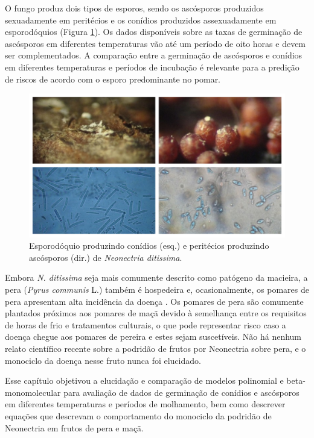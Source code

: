 \documentclass[a4paper,]{book}
\begin{document}
O fungo produz dois tipos de esporos, sendo os ascósporos produzidos
sexuadamente em peritécios e os conídios produzidos assexuadamente em
esporodóquios (Figura \ref{fig:prancha02}). Os dados disponíveis sobre
as taxas de germinação de ascósporos em diferentes temperaturas vão até
um período de oito horas \citep{Latorre2002} e devem ser complementados.
A comparação entre a germinação de ascósporos e conídios em diferentes
temperaturas e períodos de incubação é relevante para a predição de
riscos de acordo com o esporo predominante no pomar.




\begin{figure}

{\centering \includegraphics[width=1\linewidth]{./jhulia/prancha02} 

}

\caption{Esporodóquio produzindo conídios (esq.) e peritécios
produzindo ascósporos (dir.) de \emph{Neonectria ditissima}.}\label{fig:prancha02}
\end{figure}

Embora \emph{N. ditissima} seja mais comumente descrito como patógeno da
macieira, a pera (\emph{Pyrus communis} L.) também é hospedeira
\citep{Flack1977} e, ocasionalmente, os pomares de pera apresentam alta
incidência da doença \citep{Weber2014}. Os pomares de pera são comumente
plantados próximos aos pomares de maçã devido à semelhança entre os
requisitos de horas de frio e tratamentos culturais, o que pode
representar risco caso a doença chegue aos pomares de pereira e estes
sejam suscetíveis. Não há nenhum relato científico recente sobre a
podridão de frutos por Neonectria sobre pera, e o monociclo da doença
nesse fruto nunca foi elucidado.

Esse capítulo objetivou a elucidação e comparação de modelos polinomial
e beta-monomolecular para avaliação de dados de germinação de conídios e
ascósporos em diferentes temperaturas e períodos de molhamento, bem como
descrever equações que descrevam o comportamento do monociclo da
podridão de Neonectria em frutos de pera e maçã.
\end{document}
